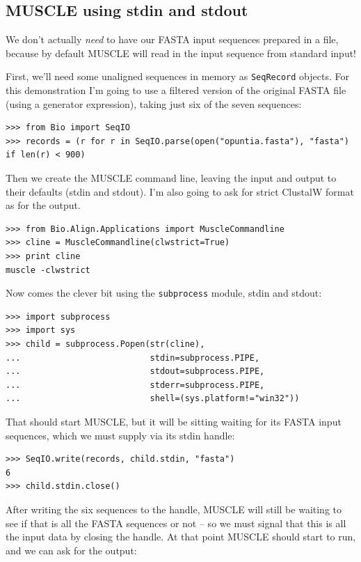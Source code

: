\documentclass{report}
\begin{document}
\subsection{MUSCLE using stdin and stdout}

We don't actually \emph{need} to have our FASTA input sequences prepared in a file,
because by default MUSCLE will read in the input sequence from standard input!

First, we'll need some unaligned sequences in memory as \verb|SeqRecord| objects.
For this demonstration I'm going to use a filtered version of the original FASTA
file (using a generator expression), taking just six of the seven sequences:

\begin{verbatim}
>>> from Bio import SeqIO
>>> records = (r for r in SeqIO.parse(open("opuntia.fasta"), "fasta") if len(r) < 900)
\end{verbatim}

Then we create the MUSCLE command line, leaving the input and output to their
defaults (stdin and stdout). I'm also going to ask for strict ClustalW format
as for the output.

\begin{verbatim}
>>> from Bio.Align.Applications import MuscleCommandline
>>> cline = MuscleCommandline(clwstrict=True)
>>> print cline
muscle -clwstrict
\end{verbatim}

Now comes the clever bit using the \verb|subprocess| module, stdin and stdout:

\begin{verbatim}
>>> import subprocess
>>> import sys
>>> child = subprocess.Popen(str(cline),
...                          stdin=subprocess.PIPE,
...                          stdout=subprocess.PIPE,
...                          stderr=subprocess.PIPE,
...                          shell=(sys.platform!="win32"))                     
\end{verbatim}

That should start MUSCLE, but it will be sitting waiting for its FASTA input
sequences, which we must supply via its stdin handle:

\begin{verbatim}
>>> SeqIO.write(records, child.stdin, "fasta")
6
>>> child.stdin.close()
\end{verbatim}

After writing the six sequences to the handle, MUSCLE will still be waiting
to see if that is all the FASTA sequences or not -- so we must signal that
this is all the input data by closing the handle. At that point MUSCLE should
start to run, and we can ask for the output:
\end{document}
